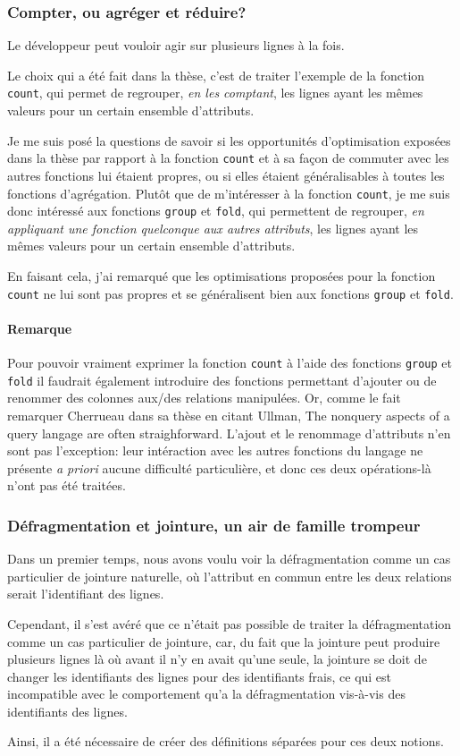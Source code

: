 \subsubsection*{Compter, ou agréger et réduire?}
Le développeur peut vouloir agir sur plusieurs lignes à la fois.

Le choix qui a été fait dans la thèse, c'est de traiter l'exemple
de la fonction \lstinline|count|, qui permet de regrouper, \emph{en les comptant},
les lignes ayant les mêmes valeurs pour un certain ensemble d'attributs.

Je me suis posé la questions de savoir si les opportunités d'optimisation
exposées dans la thèse par rapport à la fonction \lstinline|count| et à sa façon de commuter
avec les autres fonctions lui étaient propres, ou si elles étaient généralisables
à toutes les fonctions d'agrégation. Plutôt que de m'intéresser à la fonction
\lstinline|count|, je me suis donc intéressé
aux fonctions \lstinline|group| et \lstinline|fold|, qui permettent
de regrouper, \emph{en appliquant une fonction quelconque aux autres attributs},
les lignes ayant les mêmes valeurs pour un certain ensemble d'attributs.

En faisant cela, j'ai remarqué que les optimisations proposées pour la fonction
\lstinline|count| ne lui sont pas propres et se généralisent bien aux
fonctions \lstinline|group| et \lstinline|fold|.

\paragraph*{Remarque}
Pour pouvoir vraiment exprimer la fonction \lstinline|count|
à l'aide des fonctions \lstinline|group| et \lstinline|fold|
il faudrait également introduire des fonctions permettant d'ajouter ou de
renommer des colonnes aux/des relations manipulées.
Or, comme le fait remarquer Cherrueau dans sa thèse en citant Ullman,
\og The nonquery aspects of a query langage are often straighforward\fg{}.
L'ajout et le renommage d'attributs n'en sont pas l'exception:
leur intéraction avec les autres fonctions du langage ne présente
\emph{a priori} aucune difficulté particulière, et donc ces deux opérations-là
n'ont pas été traitées.

\subsubsection*{Défragmentation et jointure, un air de famille trompeur}
Dans un premier temps, nous avons voulu voir la défragmentation comme un cas
particulier de jointure naturelle, où l'attribut en commun entre
les deux relations serait l'identifiant
des lignes.

Cependant, il s'est avéré que ce n'était pas possible de traiter la défragmentation
comme un cas particulier de jointure, car, du fait que la jointure
peut produire plusieurs lignes là où avant il n'y en avait qu'une seule,
la jointure se doit de changer les identifiants des lignes pour des identifiants frais,
ce qui est incompatible avec le comportement qu'a la défragmentation
vis-à-vis des identifiants des lignes.

Ainsi, il a été nécessaire de créer des définitions séparées pour ces deux notions.
